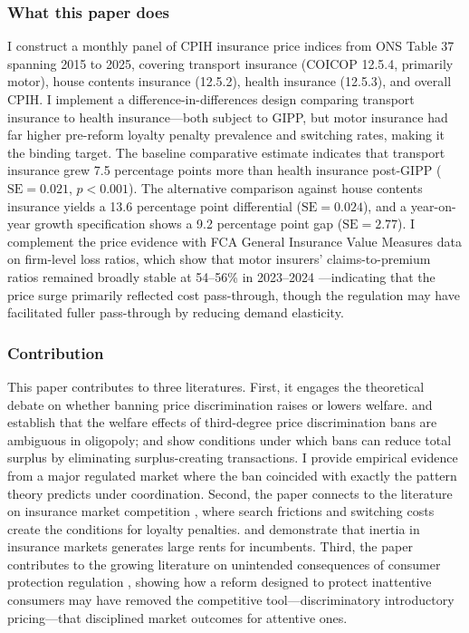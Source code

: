 \documentclass[12pt]{article}
\begin{document}
\subsubsection*{What this paper does} I construct a monthly panel of CPIH insurance price indices from ONS Table 37 spanning 2015 to 2025, covering transport insurance (COICOP 12.5.4, primarily motor), house contents insurance (12.5.2), health insurance (12.5.3), and overall CPIH. I implement a difference-in-differences design comparing transport insurance to health insurance---both subject to GIPP, but motor insurance had far higher pre-reform loyalty penalty prevalence and switching rates, making it the binding target. The baseline comparative estimate indicates that transport insurance grew 7.5 percentage points more than health insurance post-GIPP ($\text{SE} = 0.021$, $p < 0.001$). The alternative comparison against house contents insurance yields a 13.6 percentage point differential ($\text{SE} = 0.024$), and a year-on-year growth specification shows a 9.2 percentage point gap ($\text{SE} = 2.77$). I complement the price evidence with FCA General Insurance Value Measures data on firm-level loss ratios, which show that motor insurers' claims-to-premium ratios remained broadly stable at 54--56\% in 2023--2024 \citep{fca2024gvm}---indicating that the price surge primarily reflected cost pass-through, though the regulation may have facilitated fuller pass-through by reducing demand elasticity.

\subsubsection*{Contribution} This paper contributes to three literatures. First, it engages the theoretical debate on whether banning price discrimination raises or lowers welfare. \citet{schmalensee1981output} and \citet{corts1998third} establish that the welfare effects of third-degree price discrimination bans are ambiguous in oligopoly; \citet{stole2007price} and \citet{rhodes2014can} show conditions under which bans can reduce total surplus by eliminating surplus-creating transactions. I provide empirical evidence from a major regulated market where the ban coincided with exactly the pattern theory predicts under coordination. Second, the paper connects to the literature on insurance market competition \citep{dafny2010competition, honka2014quantifying}, where search frictions and switching costs create the conditions for loyalty penalties. \citet{ericson2014consumer} and \citet{handel2013adverse} demonstrate that inertia in insurance markets generates large rents for incumbents. Third, the paper contributes to the growing literature on unintended consequences of consumer protection regulation \citep{grubb2009selling, cabral2023demand}, showing how a reform designed to protect inattentive consumers may have removed the competitive tool---discriminatory introductory pricing---that disciplined market outcomes for attentive ones.
\end{document}
